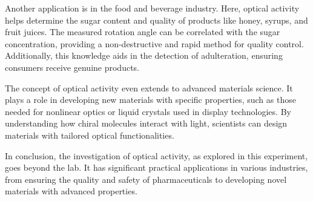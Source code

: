 \documentclass[10pt]{article}
\begin{document}
Another application is in the food and beverage industry. Here, optical activity helps determine the sugar content and quality of products like honey, syrups, and fruit juices. The measured rotation angle can be correlated with the sugar concentration, providing a non-destructive and rapid method for quality control. Additionally, this knowledge aids in the detection of adulteration, ensuring consumers receive genuine products.

The concept of optical activity even extends to advanced materials science. It plays a role in developing new materials with specific properties, such as those needed for nonlinear optics or liquid crystals used in display technologies. By understanding how chiral molecules interact with light, scientists can design materials with tailored optical functionalities.

In conclusion, the investigation of optical activity, as explored in this experiment, goes beyond the lab. It has significant practical applications in various industries, from ensuring the quality and safety of pharmaceuticals to developing novel materials with advanced properties.

\printbibliography
\end{document}
